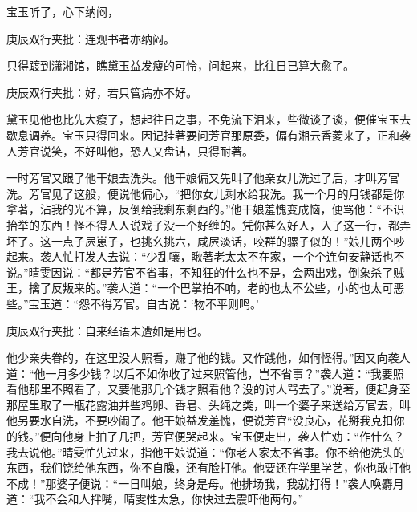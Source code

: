 \begin{parag}
    宝玉听了，心下纳闷，\begin{note}庚辰双行夹批：连观书者亦纳闷。\end{note}只得踱到潇湘馆，瞧黛玉益发瘦的可怜，问起来，比往日已算大愈了。\begin{note}庚辰双行夹批：好，若只管病亦不好。\end{note}黛玉见他也比先大瘦了，想起往日之事，不免流下泪来，些微谈了谈，便催宝玉去歇息调养。宝玉只得回来。因记挂著要问芳官那原委，偏有湘云香菱来了，正和袭人芳官说笑，不好叫他，恐人又盘诘，只得耐著。
\end{parag}


\begin{parag}
    一时芳官又跟了他干娘去洗头。他干娘偏又先叫了他亲女儿洗过了后，才叫芳官洗。芳官见了这般，便说他偏心，“把你女儿剩水给我洗。我一个月的月钱都是你拿著，沾我的光不算，反倒给我剩东剩西的。”他干娘羞愧变成恼，便骂他：“不识抬举的东西！怪不得人人说戏子没一个好缠的。凭你甚么好人，入了这一行，都弄坏了。这一点子屄崽子，也挑幺挑六，咸屄淡话，咬群的骡子似的！”娘儿两个吵起来。袭人忙打发人去说：“少乱嚷，瞅著老太太不在家，一个个连句安静话也不说。”晴雯因说：“都是芳官不省事，不知狂的什么也不是，会两出戏，倒象杀了贼王，擒了反叛来的。”袭人道：“一个巴掌拍不响，老的也太不公些，小的也太可恶些。”宝玉道：“怨不得芳官。自古说：‘物不平则鸣。’\begin{note}庚辰双行夹批：自来经语未遭如是用也。\end{note}他少亲失眷的，在这里没人照看，赚了他的钱。又作践他，如何怪得。”因又向袭人道：“他一月多少钱？以后不如你收了过来照管他，岂不省事？”袭人道：“我要照看他那里不照看了，又要他那几个钱才照看他？没的讨人骂去了。”说著，便起身至那屋里取了一瓶花露油并些鸡卵、香皂、头绳之类，叫一个婆子来送给芳官去，叫他另要水自洗，不要吵闹了。他干娘益发羞愧，便说芳官“没良心，花掰我克扣你的钱。”便向他身上拍了几把，芳官便哭起来。宝玉便走出，袭人忙劝：“作什么？我去说他。”晴雯忙先过来，指他干娘说道：“你老人家太不省事。你不给他洗头的东西，我们饶给他东西，你不自臊，还有脸打他。他要还在学里学艺，你也敢打他不成！”那婆子便说：“一日叫娘，终身是母。他排场我，我就打得！”袭人唤麝月道：“我不会和人拌嘴，晴雯性太急，你快过去震吓他两句。” 
\end{parag}
